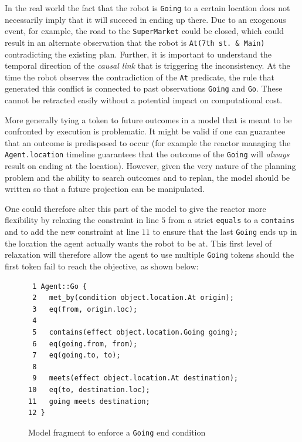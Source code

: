 In the real world the fact that the robot is \texttt{Going} to a
certain location does not necessarily imply that it will succeed in
ending up there. Due to an exogenous event, for example, the road to
the \texttt{SuperMarket} could be closed, which could result in an
alternate observation that the robot is \texttt{At(7th st. \& Main)}
contradicting the existing plan. Further, it is important to
understand the temporal direction of the \emph{causal link} that is
triggering the inconsistency. At the time the robot observes the
contradiction of the \texttt{At} predicate, the rule that generated
this conflict is connected to past observations \texttt{Going} and
\texttt{Go}. These cannot be retracted easily without a potential
impact on computational cost.

More generally tying a token to future outcomes in a model that is
meant to be confronted by execution is problematic. It might be valid
if one can guarantee that an outcome is predisposed to occur (for
example the reactor managing the \texttt{Agent.location} timeline
guarantees that the outcome of the \texttt{Going} will {\em always}
result on ending at the  location). However, given
the very nature of the planning problem and the ability to search
outcomes and to replan, the model should be written so that a future
projection can be manipulated.

One could therefore alter this part of the model to give the reactor
more flexibility by relaxing the constraint in line $5$ from a strict
\texttt{equals} to a \texttt{contains} and to add the new constraint
at line $11$ to ensure that the last \texttt{Going} ends up in the
location the agent actually wants the robot to be at. This first level
of relaxation will therefore allow the agent to use multiple
\texttt{Going} tokens should the first token fail to reach the
objective, as shown below:

\begin{figure}[tbp]
\begin{verbatim}
 1 Agent::Go {
 2   met_by(condition object.location.At origin);
 3   eq(from, origin.loc);
 4
 5   contains(effect object.location.Going going);
 6   eq(going.from, from);
 7   eq(going.to, to);
 8   
 9   meets(effect object.location.At destination);
10   eq(to, destination.loc);
11   going meets destination;
12 }
\end{verbatim}
\caption{\small Model fragment to enforce a \texttt{Going} end condition}
\label{lab:model:shopping}
\end{figure}

